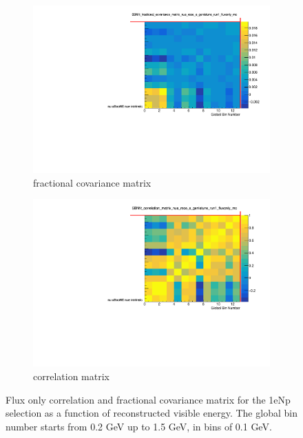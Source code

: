 \documentclass[a4paper]{article}
\begin{document}
\begin{figure}[ht] 
\begin{center}
    \begin{subfigure}[b]{0.45\textwidth}
    \centering
    \includegraphics[width=1.00\textwidth]{CovarianceMatrices/SBNfit_fractional_covariance_matrix_nue_reco_e_genietune_run1_fluxonly_mc_collapsed.pdf}
    \caption{fractional covariance matrix}
    \end{subfigure}
    \begin{subfigure}[b]{0.45\textwidth}
    \centering
    \includegraphics[width=1.00\textwidth]{CovarianceMatrices/SBNfit_correlation_matrix_nue_reco_e_genietune_run1_fluxonly_mc_collapsed.pdf}
    \caption{correlation matrix}
    \end{subfigure}
\caption{\label{fig:fluxmatrices} Flux only correlation and fractional covariance matrix for the 1eNp selection as a function of reconstructed visible energy. The global bin number starts from 0.2 GeV up to 1.5 GeV, in bins of 0.1 GeV.}
\end{center}
\end{figure}
\end{document}
